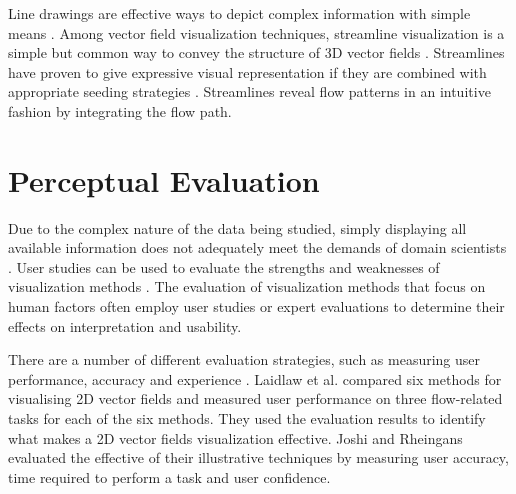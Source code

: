 Line drawings are effective ways to depict complex information with simple means \cite{benard_state_art_2011}. Among vector field visualization techniques, streamline visualization is a simple but common way to convey the structure of 3D vector fields \cite{chen_illustrative_2011}. Streamlines have proven to give expressive visual representation if they are combined with appropriate seeding strategies \cite{annen_vector_2008}. Streamlines reveal flow patterns in an intuitive fashion by integrating the flow path.

\section{Perceptual Evaluation}

Due to the complex nature of the data being studied, simply displaying all available information does not adequately meet the demands of domain scientists \cite{anderson_evaluating_2012}.
User studies can be used to evaluate the strengths and weaknesses of visualization methods \cite{christopher_thoughts_2003}.
The evaluation of visualization methods that focus on human factors often employ user studies or expert evaluations to determine their effects on interpretation and usability.

There are a number of different evaluation strategies, such as measuring user performance, accuracy and experience \cite{redmond_influencing_2010}. Laidlaw et al. \cite{laidlaw_quantitative_2001} compared six methods for visualising 2D vector fields and measured user performance on three flow-related tasks for each of the six methods. They used the evaluation results to identify what makes a 2D vector fields visualization effective.
Joshi and Rheingans \cite{joshi_evaluation_2008} evaluated the effective of their illustrative techniques by measuring user accuracy, time required to perform a task and user confidence.

